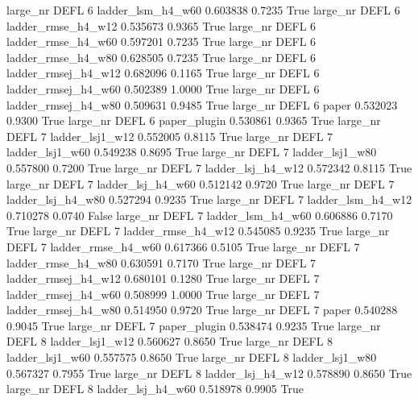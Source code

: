  large_nr     DEFL                 6   ladder_lsm_h4_w60   0.603838      0.7235    True
  large_nr     DEFL                 6  ladder_rmse_h4_w12   0.535673      0.9365    True
  large_nr     DEFL                 6  ladder_rmse_h4_w60   0.597201      0.7235    True
  large_nr     DEFL                 6  ladder_rmse_h4_w80   0.628505      0.7235    True
  large_nr     DEFL                 6 ladder_rmsej_h4_w12   0.682096      0.1165    True
  large_nr     DEFL                 6 ladder_rmsej_h4_w60   0.502389      1.0000    True
  large_nr     DEFL                 6 ladder_rmsej_h4_w80   0.509631      0.9485    True
  large_nr     DEFL                 6               paper   0.532023      0.9300    True
  large_nr     DEFL                 6        paper_plugin   0.530861      0.9365    True
  large_nr     DEFL                 7     ladder_lsj1_w12   0.552005      0.8115    True
  large_nr     DEFL                 7     ladder_lsj1_w60   0.549238      0.8695    True
  large_nr     DEFL                 7     ladder_lsj1_w80   0.557800      0.7200    True
  large_nr     DEFL                 7   ladder_lsj_h4_w12   0.572342      0.8115    True
  large_nr     DEFL                 7   ladder_lsj_h4_w60   0.512142      0.9720    True
  large_nr     DEFL                 7   ladder_lsj_h4_w80   0.527294      0.9235    True
  large_nr     DEFL                 7   ladder_lsm_h4_w12   0.710278      0.0740   False
  large_nr     DEFL                 7   ladder_lsm_h4_w60   0.606886      0.7170    True
  large_nr     DEFL                 7  ladder_rmse_h4_w12   0.545085      0.9235    True
  large_nr     DEFL                 7  ladder_rmse_h4_w60   0.617366      0.5105    True
  large_nr     DEFL                 7  ladder_rmse_h4_w80   0.630591      0.7170    True
  large_nr     DEFL                 7 ladder_rmsej_h4_w12   0.680101      0.1280    True
  large_nr     DEFL                 7 ladder_rmsej_h4_w60   0.508999      1.0000    True
  large_nr     DEFL                 7 ladder_rmsej_h4_w80   0.514950      0.9720    True
  large_nr     DEFL                 7               paper   0.540288      0.9045    True
  large_nr     DEFL                 7        paper_plugin   0.538474      0.9235    True
  large_nr     DEFL                 8     ladder_lsj1_w12   0.560627      0.8650    True
  large_nr     DEFL                 8     ladder_lsj1_w60   0.557575      0.8650    True
  large_nr     DEFL                 8     ladder_lsj1_w80   0.567327      0.7955    True
  large_nr     DEFL                 8   ladder_lsj_h4_w12   0.578890      0.8650    True
  large_nr     DEFL                 8   ladder_lsj_h4_w60   0.518978      0.9905    True
